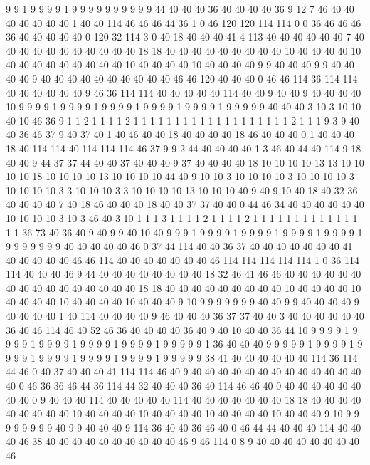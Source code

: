 9 9 1 9 9 9 9 1 9 9 9 9 9 9 9 9 9 9 44 40
40 40 36 40 40 40 40 36 9 12 7 46 40 40 40 40 40 40 40 1
40 40 114 46 46 46 44 36 1 0 46 120 120 114 114 0 0 36 46 46
46 36 40 40 40 40 40 0 120 32 114 3 0 40 18 40 40 40 41 4
113 40 40 40 40 40 40 7 40 40 40 40 40 40 40 40 40 40 40 18
18 40 40 40 40 40 40 40 40 40 10 40 40 40 40 10 40 40 40 40
40 40 40 40 40 10 40 40 40 40 10 40 40 40 40 9 9 40 40 40
9 9 40 40 40 40 9 40 40 40 40 40 40 40 40 40 40 46 46 120
40 40 40 0 46 46 114 36 114 114 40 40 40 40 40 40 9 46 36 114
114 40 40 40 40 40 114 40 40 9 40 40 9 40 40 40 40 10 9 9
9 9 1 9 9 9 9 1 9 9 9 9 1 9 9 9 9 1 9 9
9 9 1 9 9 9 9 9 40 40 40 3 10 3 10 10 40 10 46 36
9 1 1 2 1 1 1 1 2 1 1 1 1 1 1 1 1 1 1 1
1 1 1 1 1 1 1 1 2 1 1 1 9 3 9 40 40 36 46 37
9 40 37 40 1 40 46 40 40 18 40 40 40 40 18 46 40 40 40 0
1 40 40 40 18 40 114 114 40 114 114 114 46 37 9 9 2 44 40 40
40 40 1 3 46 40 44 40 114 9 18 40 40 9 44 37 37 44 40 40
37 40 40 40 9 37 40 40 40 40 18 10 10 10 10 13 13 10 10 10
10 18 10 10 10 10 13 10 10 10 10 44 40 9 10 10 3 10 10 10
10 3 10 10 10 10 3 10 10 10 10 3 3 10 10 10 3 3 10 10
10 10 13 10 10 10 40 9 40 9 10 40 18 40 32 36 40 40 40 40
7 40 18 46 40 40 40 18 40 40 37 37 40 40 0 44 46 34 40 40
40 40 40 40 10 10 10 10 3 10 3 46 40 3 10 1 1 1 3 1
1 1 1 2 1 1 1 1 2 1 1 1 1 1 1 1 1 1 1 1
1 1 1 1 36 73 40 36 40 9 40 9 9 40 10 40 9 9 9 1
9 9 9 9 1 9 9 9 9 1 9 9 9 9 1 9 9 9 9 1
9 9 9 9 9 9 9 40 40 40 40 40 46 0 37 44 114 40 40 36
37 40 40 40 40 40 40 40 41 40 40 40 40 40 46 46 114 40 40 40
40 40 40 40 46 114 114 114 114 114 1 0 36 114 114 40 40 40 46 9
44 40 40 40 40 40 40 40 40 18 32 46 41 46 46 40 40 40 40 40
40 40 40 40 40 40 40 40 40 40 40 18 18 40 40 40 40 40 40 40
40 40 10 40 40 40 40 10 40 40 40 40 10 40 40 40 40 10 40 40
40 9 10 9 9 9 9 9 9 9 40 40 9 9 40 40 40 40 9 40
40 40 40 1 40 114 40 40 40 40 9 46 40 40 40 36 37 37 40 40
3 40 40 40 40 40 40 36 40 46 114 46 40 52 46 36 40 40 40 40
36 40 9 40 10 40 40 36 44 10 9 9 9 9 1 9 9 9 9 1
9 9 9 9 1 9 9 9 9 1 9 9 9 9 1 9 9 9 9 9
1 36 40 40 40 9 9 9 9 9 1 9 9 9 9 1 9 9 9 9
1 9 9 9 9 1 9 9 9 9 1 9 9 9 9 1 9 9 9 9
9 38 41 40 40 40 40 40 40 114 36 114 44 46 0 40 37 40 40 40
41 114 114 46 40 9 40 40 40 40 40 40 40 40 40 40 40 40 40 40
0 46 36 36 46 44 36 114 44 32 40 40 40 36 40 114 46 46 40 0
40 40 40 40 40 40 40 40 0 9 40 40 40 114 40 40 40 40 40 114
40 40 40 40 40 40 40 18 18 40 40 40 40 40 40 40 40 40 10 40
40 40 40 10 40 40 40 40 10 40 40 40 40 10 40 40 40 9 10 9
9 9 9 9 9 9 9 40 9 9 40 40 40 9 114 36 40 40 36 46
40 0 46 44 44 40 40 40 114 40 40 40 46 38 40 40 40 40 40 40
40 40 40 40 46 9 46 114 0 8 9 40 40 40 40 40 40 40 40 46
